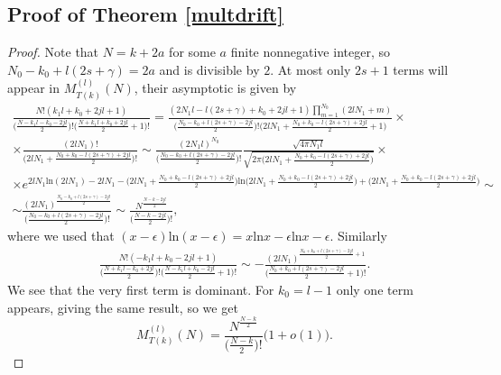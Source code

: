 \documentclass[11pt]{amsart}
\begin{document}
\subsection{Proof of Theorem \ref{multdrift}}\label{poisproof1}
\begin{proof}
	Note that $N=k+2a$ for some $a$ finite nonnegative integer, so $N_0-k_0+l(2s+\gamma)=2a$ and is divisible by $2$. At most only $2s+1$ terms will appear in $M^{(l)}_{T(k)}(N)$, their asymptotic is given by
	\begin{eqnarray*}
		\frac{N!(k_1l+k_0+2jl+1)}{\big(\frac{N-k_1l-k_0-2jl}{2}\big)! \big(\frac{N+k_1l+k_0+2jl}{2}+1\big)!}=\frac{(2N_1l-l(2s+\gamma)+k_0+2jl+1)\prod_{m=1}^{N_0}(2lN_1+m)}{\big(\frac{N_0-k_0+l(2s+\gamma)-2jl}{2}\big)!(2lN_1+\frac{N_0+k_0-l(2s+\gamma)+2jl}{2}+1\big)}\times \\
  \times\frac{(2lN_1)!}{\big(2lN_1+\frac{N_0+k_0-l(2s+\gamma)+2jl}{2}\big)!}\sim\frac{(2N_1l)^{N_0}}{\big(\frac{N_0-k_0+l(2s+\gamma)-2jl}{2}\big)!}\frac{\sqrt{4\pi N_1l}}{\sqrt{2\pi\big(2lN_1+\frac{N_0+k_0-l(2s+\gamma)+2jl}{2}\big)}}\times\\
  \times e^{2lN_1 \mathrm{ln}(2lN_1)-2lN_1-\big(2lN_1+\frac{N_0+k_0-l(2s+\gamma)+2jl}{2}\big)\mathrm{ln}\big(2lN_1+\frac{N_0+k_0-l(2s+\gamma)+2jl}{2}\big)+\big(2lN_1+\frac{N_0+k_0-l(2s+\gamma)+2jl}{2}\big)}\sim\\
		\sim \frac{(2lN_1)^{\frac{N_0-k_0+l(2s+\gamma)-2jl}{2}}}{\big(\frac{N_0-k_0+l(2s+\gamma)-2jl}{2}\big)!}\sim \frac{N^{\frac{N-k-2jl}{2}}}{\big(\frac{N-k-2jl}{2}\big)!},
	\end{eqnarray*}
	where we used that $(x-\epsilon)\mathrm{ln}(x-\epsilon)=x\mathrm{ln}x-\epsilon \mathrm{ln}x-\epsilon$.
	Similarly
	\begin{eqnarray*}
		\frac{N!(-k_1l+k_0-2jl+1)}{\big(\frac{N+k_1l-k_0+2jl}{2}\big)! \big(\frac{N-k_1l+k_0-2jl}{2}+1\big)!}\sim-\frac{(2lN_1)^{\frac{N_0+k_0+l(2s+\gamma)-2jl}{2}+1}}{\big(\frac{N_0+k_0+l(2s+\gamma)-2jl}{2}+1\big)!}.
	\end{eqnarray*}
	We see that the very first term is dominant. For $k_0=l-1$ only one term appears, giving the same result, so we get
	\begin{equation*}
	M^{(l)}_{T(k)}(N)=\frac{N^\frac{N-k}{2}}{\big(\frac{N-k}{2}\big)!}\Big(1+o(1)\Big).
	\end{equation*}
\end{proof}
\end{document}
